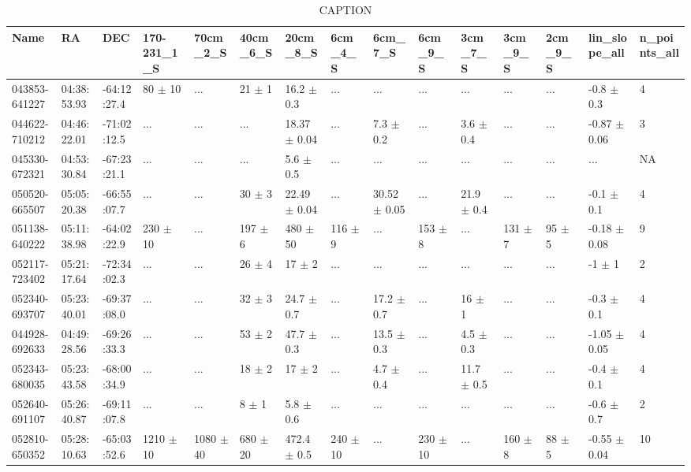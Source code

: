 \begin{table}[ht]
\centering
\begin{tabular}{lllllllllllllll}
  \hline
Name & RA & DEC & 170-231_1_S & 70cm_2_S & 40cm_6_S & 20cm_8_S & 6cm_4_S & 6cm_7_S & 6cm_9_S & 3cm_7_S & 3cm_9_S & 2cm_9_S & lin_slope_all & n_points_all \\ 
  \hline
043853-641227 & 04:38:53.93 & -64:12:27.4 & 80 $\pm$ 10 & ... & 21 $\pm$ 1 & 16.2 $\pm$ 0.3 & ... & ... & ... & ... & ... & ... & -0.8 $\pm$ 0.3 & 4 \\ 
  044622-710212 & 04:46:22.01 & -71:02:12.5 & ... & ... & ... & 18.37 $\pm$ 0.04 & ... & 7.3 $\pm$ 0.2 & ... & 3.6 $\pm$ 0.4 & ... & ... & -0.87 $\pm$ 0.06 & 3 \\ 
  045330-672321 & 04:53:30.84 & -67:23:21.1 & ... & ... & ... & 5.6 $\pm$ 0.5 & ... & ... & ... & ... & ... & ... & ... & NA \\ 
  050520-665507 & 05:05:20.38 & -66:55:07.7 & ... & ... & 30 $\pm$ 3 & 22.49 $\pm$ 0.04 & ... & 30.52 $\pm$ 0.05 & ... & 21.9 $\pm$ 0.4 & ... & ... & -0.1 $\pm$ 0.1 & 4 \\ 
  051138-640222 & 05:11:38.98 & -64:02:22.9 & 230 $\pm$ 10 & ... & 197 $\pm$ 6 & 480 $\pm$ 50 & 116 $\pm$ 9 & ... & 153 $\pm$ 8 & ... & 131 $\pm$ 7 & 95 $\pm$ 5 & -0.18 $\pm$ 0.08 & 9 \\ 
  052117-723402 & 05:21:17.64 & -72:34:02.3 & ... & ... & 26 $\pm$ 4 & 17 $\pm$ 2 & ... & ... & ... & ... & ... & ... & -1 $\pm$ 1 & 2 \\ 
  052340-693707 & 05:23:40.01 & -69:37:08.0 & ... & ... & 32 $\pm$ 3 & 24.7 $\pm$ 0.7 & ... & 17.2 $\pm$ 0.7 & ... & 16 $\pm$ 1 & ... & ... & -0.3 $\pm$ 0.1 & 4 \\ 
  044928-692633 & 04:49:28.56 & -69:26:33.3 & ... & ... & 53 $\pm$ 2 & 47.7 $\pm$ 0.3 & ... & 13.5 $\pm$ 0.3 & ... & 4.5 $\pm$ 0.3 & ... & ... & -1.05 $\pm$ 0.05 & 4 \\ 
  052343-680035 & 05:23:43.58 & -68:00:34.9 & ... & ... & 18 $\pm$ 2 & 17 $\pm$ 2 & ... & 4.7 $\pm$ 0.4 & ... & 11.7 $\pm$ 0.5 & ... & ... & -0.4 $\pm$ 0.1 & 4 \\ 
  052640-691107 & 05:26:40.87 & -69:11:07.8 & ... & ... & 8 $\pm$ 1 & 5.8 $\pm$ 0.6 & ... & ... & ... & ... & ... & ... & -0.6 $\pm$ 0.7 & 2 \\ 
  052810-650352 & 05:28:10.63 & -65:03:52.6 & 1210 $\pm$ 10 & 1080 $\pm$ 40 & 680 $\pm$ 20 & 472.4 $\pm$ 0.5 & 240 $\pm$ 10 & ... & 230 $\pm$ 10 & ... & 160 $\pm$ 8 & 88 $\pm$ 5 & -0.55 $\pm$ 0.04 & 10 \\ 
   \hline
\end{tabular}
\caption{CAPTION} 
\label{fig:maintable}
\end{table}

